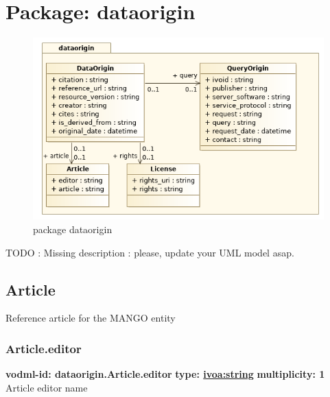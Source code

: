 \pagebreak
\section{Package: dataorigin }
  \begin{figure}[h]
    \includegraphics[width=1.0\textwidth]{../model/dataorigin.png}
    \caption{package dataorigin}
    \label{fig:dataorigin}
  \end{figure}




  TODO : Missing description : please, update your UML model asap.

  \subsection{Article}
  \label{sect:dataorigin.Article}
    Reference article for the MANGO entity

    \subsubsection{Article.editor}
      \textbf{vodml-id: dataorigin.Article.editor} \newline
      \textbf{type: \hyperref[sect:ivoa]{ivoa:string}} \newline
      \textbf{multiplicity: 1} \newline 
      Article editor name

